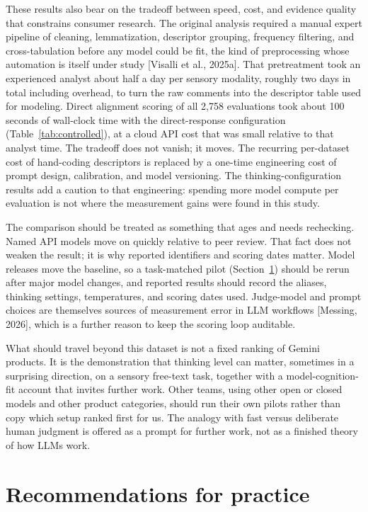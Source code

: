 \documentclass[11pt]{article}
\begin{document}
These results also bear on the tradeoff between speed, cost, and evidence
quality that constrains consumer research. The original analysis required a
manual expert pipeline of cleaning, lemmatization, descriptor grouping,
frequency filtering, and cross-tabulation before any model could be fit, the
kind of preprocessing whose automation is itself under study [Visalli et al.,
2025a]. That pretreatment took an experienced analyst about half a day per
sensory modality, roughly two days in total including overhead, to turn the
raw comments into the descriptor table used for modeling. Direct alignment
scoring of all 2,758 evaluations took about 100 seconds of wall-clock time
with the direct-response configuration (Table~\ref{tab:controlled}), at a
cloud API cost that was small relative to that analyst time. The tradeoff does
not vanish; it moves. The recurring per-dataset cost of hand-coding
descriptors is replaced by a one-time engineering cost of prompt design,
calibration, and model versioning. The thinking-configuration results add a
caution to that engineering: spending more model compute per evaluation is not
where the measurement gains were found in this study.

The comparison should be treated as something that ages and needs rechecking.
Named API models move on quickly relative to peer review. That fact does not
weaken the result; it is why reported identifiers and scoring dates matter.
Model releases move the baseline, so a task-matched pilot
(Section~\ref{sec:recs}) should be rerun after major model changes, and
reported results should record the aliases, thinking settings, temperatures,
and scoring dates used. Judge-model and prompt choices are themselves sources
of measurement error in LLM workflows [Messing, 2026], which is a further
reason to keep the scoring loop auditable.

What should travel beyond this dataset is not a fixed ranking of Gemini
products. It is the demonstration that thinking level can matter, sometimes in
a surprising direction, on a sensory free-text task, together with a
model-cognition-fit account that invites further work. Other teams, using
other open or closed models and other product categories, should run their own
pilots rather than copy which setup ranked first for us. The analogy with
fast versus deliberate human judgment is offered as a prompt for further work,
not as a finished theory of how LLMs work.

\section{Recommendations for practice}
\label{sec:recs}
\end{document}
